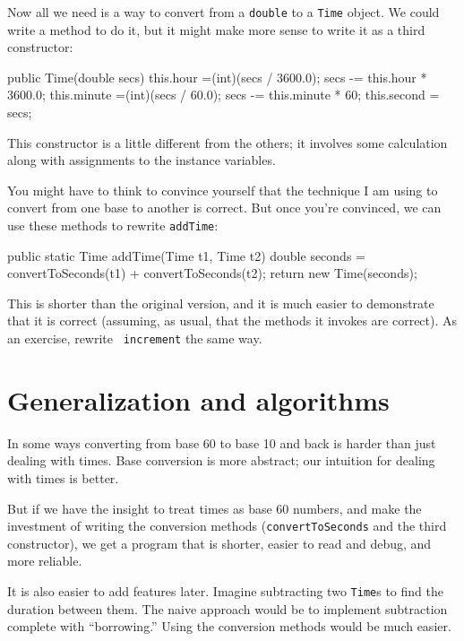 Now all we need is a way to convert from a {\tt double}
to a {\tt Time} object.  We could write a method to
do it, but it might make more sense to write it as a third
constructor:

\begin{code}
public Time(double secs) {
    this.hour =(int)(secs / 3600.0);
    secs -= this.hour * 3600.0;
    this.minute =(int)(secs / 60.0);
    secs -= this.minute * 60;
    this.second = secs;
}
\end{code}

This constructor is a little different from the others;
it involves some calculation along with assignments to the
instance variables.

You might have to think to convince yourself that the technique
I am using to convert from one base to another is correct.  But once
you're convinced, we can use these methods to rewrite {\tt addTime}:

\begin{code}
public static Time addTime(Time t1, Time t2) {
    double seconds = convertToSeconds(t1) + convertToSeconds(t2);
    return new Time(seconds);
}
\end{code}

This is shorter than the original version, and it is much easier
to demonstrate that it is correct (assuming, as usual, that the
methods it invokes are correct).  As an exercise, rewrite {\tt
increment} the same way.


\section{Generalization and algorithms}


In some ways converting from base 60 to base 10 and back is
harder than just dealing with times.  Base conversion is more
abstract; our intuition for dealing with times is better.

But if we have the insight to treat times as base 60 numbers,
and make the investment of writing the conversion methods
({\tt convertToSeconds} and the third constructor), we get
a program that is shorter, easier to read and debug, and more
reliable.

It is also easier to add features later.  Imagine
subtracting two {\tt Time}s to find the duration between them.  The
naive approach would be to implement subtraction complete with
``borrowing.''  Using the conversion methods would be much easier.

